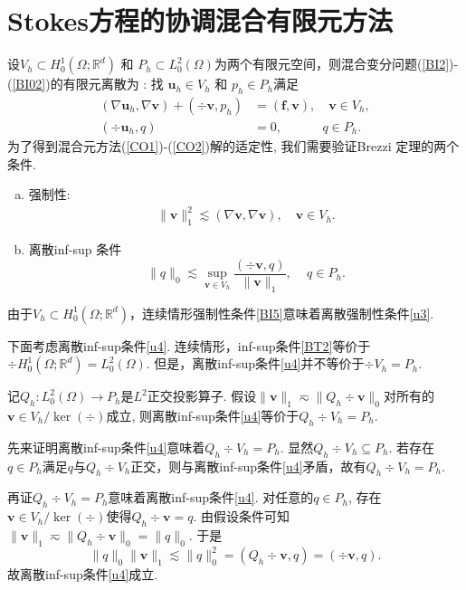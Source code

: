 \section{Stokes方程的协调混合有限元方法}
设$ V_h \subset H_0^{1}(\Omega; \mathbb{R}^{d})$ 和 $P_h \subset  L_{0}^{2}(\Omega)$为两个有限元空间，则混合变分问题(\ref{BI2})-(\ref{BI02})的有限元离散为 : 找 $\boldsymbol{u}_h \in  V_h$ 和 $p_h \in P_h$满足
\begin{align}
(\nabla\boldsymbol{u}_h,\nabla\boldsymbol{v}) + (\div\boldsymbol{v},p_h) &=(\boldsymbol{f},\boldsymbol{v}),\quad \boldsymbol{v}\in   V_h,\label{CO1}\\
(\div\boldsymbol{u}_h,q) &=0, \quad\quad\quad\, q\in P_h.\label{CO2}
\end{align}
为了得到混合元方法(\ref{CO1})-(\ref{CO2})解的适定性, 我们需要验证Brezzi 定理的两个条件.
\begin{enumerate}[(a)]
\item 强制性:
\begin{align}\label{u3}
\|\boldsymbol{v}\|^{2}_{1}
\lesssim (\nabla\boldsymbol{v},\nabla\boldsymbol{v}),\quad \boldsymbol{v}\in  V_h.\end{align}
\item 离散inf-sup 条件
\begin{equation}\label{u4}
\|q\|_{0}\lesssim\sup _{\boldsymbol{v} \in  V_h}
\frac{(\div\boldsymbol{v}, q)}{\|\boldsymbol{v}\|_{1}},\quad\, q\in P_h.
\end{equation}
\end{enumerate}

由于$ V_h \subset H_0^{1}(\Omega; \mathbb{R}^{d})$，连续情形强制性条件\eqref{BI5}意味着离散强制性条件\eqref{u3}.

下面考虑离散inf-sup条件\eqref{u4}. 连续情形，inf-sup条件\eqref{BT2}等价于$\div H_0^{1}(\Omega; \mathbb{R}^{d})=L_{0}^{2}(\Omega)$. 但是，离散inf-sup条件\eqref{u4}并不等价于$\div V_h=P_h$.

\begin{lemma}
记$Q_h :L_0^{2}(\Omega)\rightarrow  P_h$是$L^2$正交投影算子.
假设$\|\boldsymbol{v}\|_1\eqsim \|Q_h\div\boldsymbol{v}\|_0$对所有的$\boldsymbol{v}\in V_h/\ker(\div)$成立, 则离散inf-sup条件\eqref{u4}等价于$Q_h\div V_h=P_h$.
\end{lemma}
\begin{prf}
先来证明离散inf-sup条件\eqref{u4}意味着$Q_h\div V_h=P_h$. 显然$Q_h\div V_h\subseteq P_h$. 若存在$q\in P_h$满足$q$与$Q_h\div V_h$正交，则与离散inf-sup条件\eqref{u4}矛盾，故有$Q_h\div V_h=P_h$.

再证$Q_h\div V_h=P_h$意味着离散inf-sup条件\eqref{u4}. 对任意的$q\in P_h$, 存在$\boldsymbol{v}\in V_h/\ker(\div)$使得$Q_h\div\boldsymbol{v}=q$. 由假设条件可知$\|\boldsymbol{v}\|_1\eqsim \|Q_h\div\boldsymbol{v}\|_0=\|q\|_0$. 于是
\begin{equation*}
\|q\|_0\|\boldsymbol{v}\|_1\lesssim \|q\|_0^2=(Q_h\div\boldsymbol{v}, q)=(\div\boldsymbol{v}, q).
\end{equation*}
故离散inf-sup条件\eqref{u4}成立.
\end{prf}

